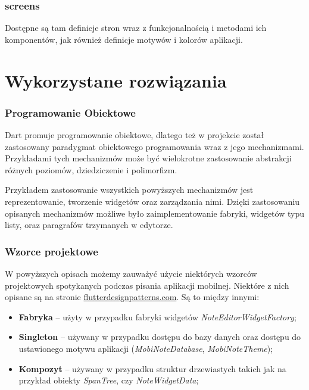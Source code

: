 \subsubsection{screens}

Dostępne są tam definicje stron wraz z funkcjonalnością i metodami ich komponentów, jak również definicje motywów i kolorów aplikacji.

\section{Wykorzystane rozwiązania}

\subsubsection{Programowanie Obiektowe}

Dart promuje programowanie obiektowe, dlatego też w projekcie został zastosowany paradygmat obiektowego programowania wraz z jego mechanizmami. Przykładami tych mechanizmów może być wielokrotne zastosowanie abstrakcji różnych poziomów, dziedziczenie i polimorfizm.

Przykładem zastosowanie wszystkich powyższych mechanizmów jest reprezentowanie, tworzenie widgetów oraz zarządzania nimi. 
Dzięki zastosowaniu opisanych mechanizmów możliwe było zaimplementowanie fabryki, widgetów typu listy, oraz paragrafów trzymanych w edytorze.

\subsubsection{Wzorce projektowe}

W powyższych opisach możemy zauważyć użycie niektórych wzorców projektowych spotykanych podczas pisania aplikacji mobilnej. Niektóre z nich opisane są na stronie \href{https://flutterdesignpatterns.com/}{flutterdesignpatterns.com}. Są to między innymi:

\begin{itemize}
    \item \textbf{Fabryka} -- użyty w przypadku fabryki widgetów \textit{NoteEditorWidgetFactory};
    \item \textbf{Singleton} -- używany w przypadku dostępu do bazy danych oraz dostępu do ustawionego motywu aplikacji (\textit{MobiNoteDatabase}, \textit{MobiNoteTheme});
    \item \textbf{Kompozyt} -- używany w przypadku struktur drzewiastych takich jak na przykład obiekty \textit{SpanTree}, czy \textit{NoteWidgetData};
\end{itemize}

